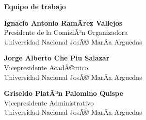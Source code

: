 \begin{center}
{\bf \Huge Equipo de trabajo}
\end{center}
\vspace{1cm}

\begin{center}
\textbf{Ignacio Antonio RamÃ­rez Vallejos}\\
Presidente de la ComisiÃ³n Organizadora \\
Universidad Nacional JosÃ© MarÃ­a Arguedas \\
\end{center}

\begin{center}
\textbf{Jorge Alberto Che Piu Salazar}\\
Vicepresidente AcadÃ©mico \\
Universidad Nacional JosÃ© MarÃ­a Arguedas \\
\end{center}

\begin{center}
\textbf{Griseldo PlatÃ³n Palomino Quispe}\\
Vicepresidente Administrativo \\
Universidad Nacional JosÃ© MarÃ­a Arguedas \\
\end{center}






